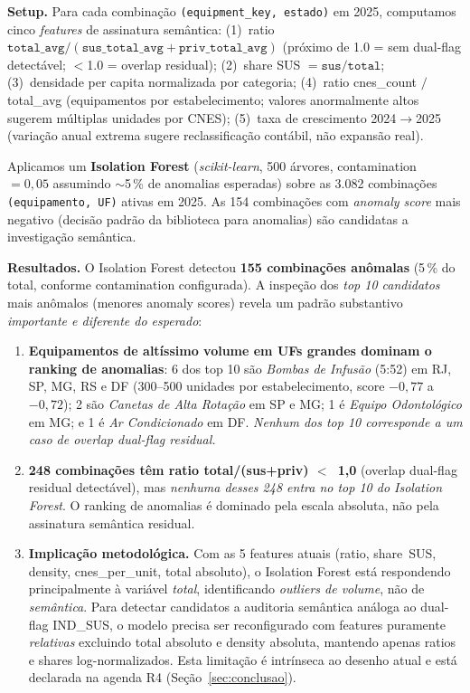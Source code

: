 \documentclass[12pt,a4paper,oneside]{article}
\begin{document}
\textbf{Setup.} Para cada combinação
\texttt{(equipment\_key, estado)} em 2025, computamos cinco
\textit{features} de assinatura semântica: (1)~ratio
$\texttt{total\_avg} / (\texttt{sus\_total\_avg} +
\texttt{priv\_total\_avg})$ (próximo de 1.0 = sem dual-flag
detectável; $<$1.0 = overlap residual);
(2)~share SUS $= \texttt{sus} / \texttt{total}$;
(3)~densidade per capita normalizada por categoria;
(4)~ratio cnes\_count $/$ total\_avg (equipamentos por
estabelecimento; valores anormalmente altos sugerem múltiplas
unidades por CNES);
(5)~taxa de crescimento 2024$\rightarrow$2025 (variação anual
extrema sugere reclassificação contábil, não expansão real).

Aplicamos um \textbf{Isolation Forest} (\textit{scikit-learn},
500 árvores, contamination~$=0{,}05$ assumindo $\sim$5\,\% de
anomalias esperadas) sobre as 3.082 combinações
\texttt{(equipamento, UF)} ativas em 2025. As 154 combinações com
\textit{anomaly score} mais negativo (decisão padrão da
biblioteca para anomalias) são candidatas a investigação semântica.

\textbf{Resultados.} O Isolation Forest detectou \textbf{155
combinações anômalas} (5\,\% do total, conforme contamination
configurada). A inspeção dos \textit{top 10 candidatos} mais
anômalos (menores anomaly scores) revela um padrão substantivo
\textit{importante e diferente do esperado}:

\begin{enumerate}
\item \textbf{Equipamentos de altíssimo volume em UFs grandes
dominam o ranking de anomalias}: 6 dos top 10 são \textit{Bombas
de Infusão} (5{:}52) em RJ, SP, MG, RS e DF (300--500 unidades por
estabelecimento, score $-0{,}77$ a $-0{,}72$); 2 são \textit{Canetas
de Alta Rotação} em SP e MG; 1 é \textit{Equipo Odontológico} em
MG; e 1 é \textit{Ar Condicionado} em DF. \textit{Nenhum dos top
10 corresponde a um caso de overlap dual-flag residual.}

\item \textbf{248 combinações têm ratio total/(sus+priv) $<$~1{,}0}
(overlap dual-flag residual detectável), mas \textit{nenhuma
desses 248 entra no top 10 do Isolation Forest}. O ranking de
anomalias é dominado pela escala absoluta, não pela assinatura
semântica residual.

\item \textbf{Implicação metodológica.} Com as 5 features atuais
(ratio, share~SUS, density, cnes\_per\_unit, total absoluto), o
Isolation Forest está respondendo principalmente à variável
\textit{total}, identificando \textit{outliers de volume}, não de
\textit{semântica}. Para detectar candidatos a auditoria semântica
análoga ao dual-flag IND\_SUS, o modelo precisa ser reconfigurado
com features puramente \textit{relativas} \textemdash{} excluindo
total absoluto e density absoluta, mantendo apenas ratios e shares
log-normalizados. Esta limitação é intrínseca ao desenho atual e
está declarada na agenda R4 (Seção~\ref{sec:conclusao}).
\end{enumerate}
\end{document}
